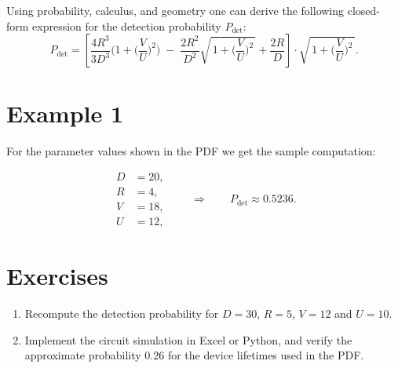 Using probability, calculus, and geometry one can derive the following closed-form expression for the detection probability \(P_{\mathrm{det}}\):\\

\[
    P_{\mathrm{det}} =
    \left[
    \frac{4R^{3}}{3D^{3}}\Bigg(1+\Big(\frac{V}{U}\Big)^{2}\Bigg)
    \;-\;
    \frac{2R^{2}}{D^{2}}\sqrt{\,1+\Big(\frac{V}{U}\Big)^{2}\,} +
    \frac{2R}{D}\right]\cdot \sqrt{\,1+\Big(\frac{V}{U}\Big)^{2}\,}.
\]


\section{Example 1}
For the parameter values shown in the PDF we get the sample computation:

\[
    \begin{aligned}
        D &= 20,\\
        R &= 4,\\
        V &= 18,\\
        U &= 12,
    \end{aligned}
    \qquad\Rightarrow\qquad
    P_{\mathrm{det}} \approx 0.5236.
\]

\section{Exercises}
\begin{enumerate}
  \item Recompute the detection probability for $D = 30$, $R=5$, $V=12$ and $U=10$.
  \item Implement the circuit simulation in Excel or Python, and verify the approximate probability $0.26$ for the device lifetimes used in the PDF.
\end{enumerate}
